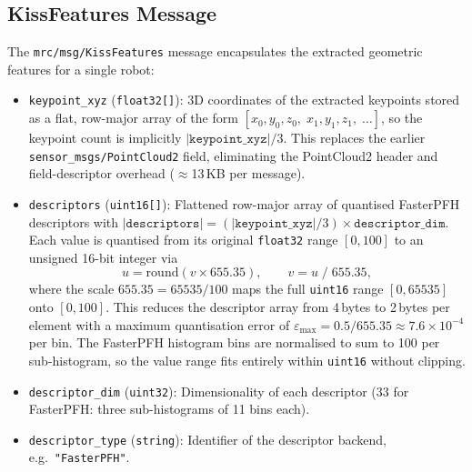 \subsection{KissFeatures Message}

The \texttt{mrc/msg/KissFeatures} message encapsulates the extracted
geometric features for a single robot:

\begin{itemize}
    \item \texttt{keypoint\_xyz} (\texttt{float32[]}): 3D coordinates of the
          extracted keypoints stored as a flat, row-major array of the form
          $[x_0, y_0, z_0,\; x_1, y_1, z_1,\; \ldots]$, so the keypoint count
          is implicitly $|\texttt{keypoint\_xyz}| / 3$.
          This replaces the earlier \texttt{sensor\_msgs/PointCloud2} field,
          eliminating the PointCloud2 header and field-descriptor overhead
          ($\approx$13\,KB per message).

    \item \texttt{descriptors} (\texttt{uint16[]}): Flattened row-major array
          of quantised FasterPFH descriptors with
          $|\texttt{descriptors}| = (|\texttt{keypoint\_xyz}| / 3) \times
          \texttt{descriptor\_dim}$.
          Each value is quantised from its original \texttt{float32} range
          $[0, 100]$ to an unsigned 16-bit integer via
          \begin{equation}
              u = \mathrm{round}(v \times 655.35), \qquad
              v = u \;/\; 655.35,
          \end{equation}
          where the scale $655.35 = 65535/100$ maps the full \texttt{uint16}
          range $[0, 65535]$ onto $[0, 100]$.
          This reduces the descriptor array from 4\,bytes to 2\,bytes per
          element with a maximum quantisation error of
          $\varepsilon_{\max} = 0.5/655.35 \approx 7.6\times10^{-4}$ per bin.
          The FasterPFH histogram bins are normalised to sum to 100 per
          sub-histogram, so the value range fits entirely within
          \texttt{uint16} without clipping.

    \item \texttt{descriptor\_dim} (\texttt{uint32}): Dimensionality of each
          descriptor (33 for FasterPFH: three sub-histograms of 11 bins each).

    \item \texttt{descriptor\_type} (\texttt{string}): Identifier of the
          descriptor backend, e.g.\ \texttt{"FasterPFH"}.
\end{itemize}

